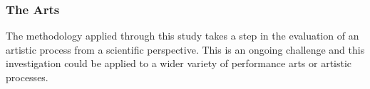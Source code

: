 \subsubsection{The Arts}

The methodology applied through this study takes a step in the evaluation of an artistic process from a scientific perspective. This is an ongoing challenge and this investigation could be applied to a wider variety of performance arts or artistic processes. \more






